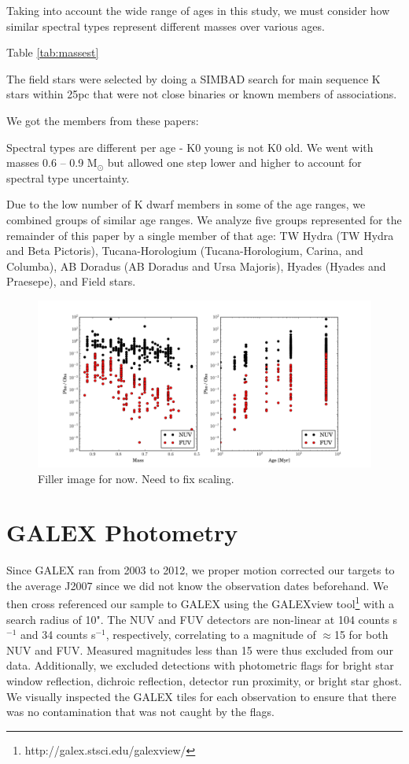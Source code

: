 \documentclass[twocolumn]{aastex62}
\begin{document}
Taking into account the wide range of ages in this study, we must consider how similar spectral types represent different masses over various ages. 

Table \ref{tab:massest}


The field stars were selected by doing a SIMBAD search for main sequence K stars within 25pc that were not close binaries or known members of associations. 




We got the members from these papers:

Spectral types are different per age - K0 young is not K0 old. We went with masses 0.6 -- 0.9 M$_{\odot}$ but allowed one step lower and higher to account for spectral type uncertainty.


Due to the low number of K dwarf members in some of the age ranges, we combined groups of similar age ranges. We analyze five groups represented for the remainder of this paper by a single member of that age: TW Hydra (TW Hydra and Beta Pictoris), Tucana-Horologium (Tucana-Horologium, Carina, and Columba), AB Doradus (AB Doradus and Ursa Majoris), Hyades (Hyades and Praesepe), and Field stars. 

\begin{figure}[t]
\centering
\includegraphics[width=0.9\linewidth]{phot_obs.pdf}
\caption{Filler image for now. Need to fix scaling. \label{fig:phot_obs}}
\end{figure}

\section{GALEX Photometry}\label{sec:photometry}




Since GALEX ran from 2003 to 2012, we proper motion corrected our targets to the average J2007 since we did not know the observation dates beforehand. We then cross referenced our sample to GALEX using the GALEXview tool\footnote{http://galex.stsci.edu/galexview/} with a search radius of 10". The NUV and FUV detectors are non-linear at 104 counts s$^{-1}$ and 34 counts s$^{-1}$, respectively, correlating to a magnitude of $\approx$15 for both NUV and FUV. Measured magnitudes less than 15 were thus excluded from our data. Additionally, we excluded detections with photometric flags for bright star window reflection, dichroic reflection, detector run proximity, or bright star ghost. We visually inspected the GALEX tiles for each observation to ensure that there was no contamination that was not caught by the flags. 
\end{document}
